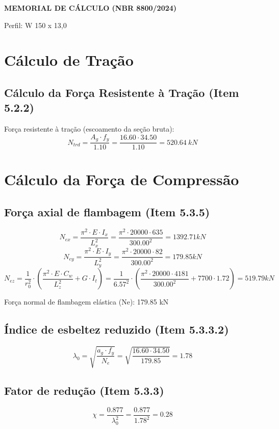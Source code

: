 \documentclass{article}%
\begin{document}
%
\normalsize%
\begin{center}%
\textbf{\Large MEMORIAL DE CÁLCULO (NBR 8800/2024)}\par%
\end{center}%
Perfil: W 150 x 13,0%
\section{Cálculo de Tração}%
\label{sec:ClculodeTrao}%

%
\subsection{Cálculo da Força Resistente à Tração (Item 5.2.2)}%
\label{subsec:ClculodaForaResistenteTrao(Item5.2.2)}%
Força resistente à tração (escoamento da seção bruta):%
\[%
N_{{trd}} = \frac{{A_g \cdot f_y}}{1.10}  = \frac{{16.60 \cdot 34.50}}{1.10} = 520.64  ~  kN%
\]

%
\section{Cálculo da Força de Compressão}%
\label{sec:ClculodaForadeCompresso}%

%
\subsection{Força axial de flambagem (Item 5.3.5)}%
\label{subsec:Foraaxialdeflambagem(Item5.3.5)}%
\[%
N_{ex} = \frac{{\pi^2 \cdot E \cdot I_x}}{L_x^2} = \frac{{\pi^2 \cdot 20000 \cdot 635}}{300.00^2} = 1392.71    kN 
%
\]%
\[%
N_{ey} = \frac{{\pi^2 \cdot E \cdot I_y}}{L_y^2} = \frac{{\pi^2 \cdot 20000 \cdot 82}}{300.00^2} = 179.85    kN 
%
\]%
\[%
N_{ez} = \frac{1}{r_0^2} \cdot \left(\frac{\pi^2 \cdot E \cdot C_w}{L_z^2} + G \cdot I_t \right)  = \frac{1}{6.57^2} \cdot \left(\frac{\pi^2 \cdot 20000 \cdot 4181}{300.00^2} + 7700 \cdot 1.72 \right) = 519.79    kN 
%
\]

%
Força normal de flambagem elástica (Ne): 179.85 kN%
\subsection{Índice de esbeltez reduzido (Item 5.3.3.2)}%
\label{subsec:ndicedeesbeltezreduzido(Item5.3.3.2)}%
\[%
\lambda_0 = \sqrt{\frac{a_g \cdot f_y}{N_e}} = \sqrt{\frac{16.60 \cdot 34.50}{179.85}} = 1.78 
%
\]

%
\subsection{Fator de redução (Item 5.3.3)}%
\label{subsec:Fatordereduo(Item5.3.3)}%
\[%
\chi = \frac{0.877}{\lambda_0^2}  = \frac{0.877}{1.78^2} = 0.28 
%
\]
\end{document}
